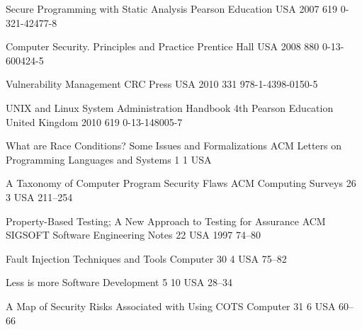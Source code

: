 \begin{thebibliography}{9}
		{}
		{Secure Programming with Static Analysis}
		{}
		{Pearson Education}
		{USA}
		{2007}
		{619}
		{0-321-42477-8}
	
		{
			\biband
			}
		{Computer Security. Principles and Practice}
		{}
		{Prentice Hall}
		{USA}
		{2008}
		{880}
		{0-13-600424-5}
	
		{}
		{Vulnerability Management}
		{}
		{CRC Press}
		{USA}
		{2010}
		{331}
		{978-1-4398-0150-5}
	
		{
			\biband
			\biband
			\biband
			}
		{{UNIX} and {L}inux System Administration Handbook}
		{4th}
		{Pearson Education}
		{United Kingdom}
		{2010}
		{619}
		{0-13-148005-7}
		

		{
			\biband
			}
		{What are Race Conditions? Some Issues and Formalizations}
		{ACM Letters on Programming Languages and Systems}
		{1}
		{1}
		{USA}
		{}
		{}
	
		{
			\biband
			\biband
			\biband
			}
		{A Taxonomy of Computer Program Security Flaws}
		{ACM Computing Surveys}
		{26}
		{3}
		{USA}
		{}
		{211--254}
		
		{
			\biband
			}
		{Property-Based Testing; A New Approach to Testing for Assurance}
		{ACM SIGSOFT Software Engineering Notes}
		{22}
		{}
		{USA}
		{1997}
		{74--80}
	
		{
			\biband
			\biband
			}
		{Fault Injection Techniques and Tools}
		{Computer}
		{30}
		{4}
		{USA}
		{}
		{75--82}
	
		{}
		{Less is more}
		{Software Development}
		{5}
		{10}
		{USA}
		{}
		{28--34}
	
		{
			\biband
			}
		{A Map of Security Risks Associated with Using {COTS}}
		{Computer}
		{31}
		{6}
		{USA}
		{}
		{60--66}
	

\end{thebibliography}
